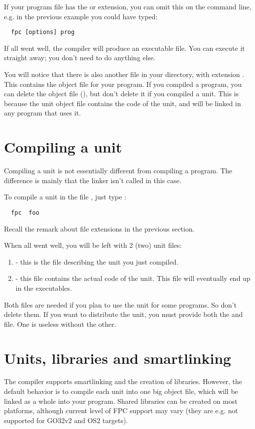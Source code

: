 If your program file has the  or  extension,
you can omit this on the command line, e.g. in the previous example you
could have typed:
\begin{verbatim}
  fpc [options] prog
\end{verbatim}

If all went well, the compiler will produce an executable file. You can execute
it straight away; you don't need to do anything else.

You will notice that there is also another file in your directory, with
extension . This contains the object file for your program.
If you compiled a program, you can delete the object file (),
but don't delete it if you compiled a unit. This is because
the unit object file contains the code of the unit, and will be
linked in any program that uses it.



\section{Compiling a unit}

Compiling a unit is not essentially different from compiling a program.
The difference is mainly that the linker isn't called in this case.

To compile a unit in the file , just type :
\begin{verbatim}
  fpc  foo
\end{verbatim}
Recall the remark about file extensions in the previous section.

When all went well, you will be left with 2 (two) unit files:
\begin{enumerate}
\item {} - this is the file describing the unit you just
compiled.
\item {} - this file contains the actual code of the unit.
This file will eventually end up in the executables.
\end{enumerate}
Both files are needed if you plan to use the unit for some programs.
So don't delete them. If you want to distribute the unit, you must
provide both the  and  file. One is useless without the
other.

\section{Units, libraries and smartlinking}
The \fpc compiler supports smartlinking and the creation of libraries.
However, the default behavior is to compile each unit into one big object
file, which will be linked as a whole into your program.
Shared libraries can be created on most platforms, although current level
of FPC support may vary (they are e.g. not supported for GO32v2 and OS2
targets).

